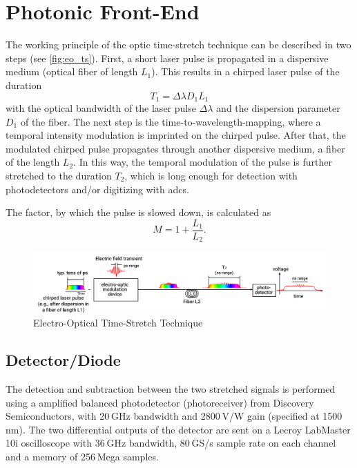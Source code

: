 \section{Photonic Front-End}
The working principle of the optic time-stretch technique can be described in two steps (see \autoref{fig:eo_ts}).
First, a short laser pulse is propagated in a dispersive medium (optical fiber of length $L_1$). %
This results in a chirped laser pulse of the duration
\begin{equation}
	T_1 = \Delta \lambda D_1 L_1
\end{equation}
with the optical bandwidth of the laser pulse $\Delta \lambda$  and the dispersion parameter $D_1$ of the fiber.
The next step is the time-to-wavelength-mapping, where a temporal intensity modulation is imprinted on the chirped pulse.
After that, the modulated chirped pulse propagates through another dispersive medium, a fiber of the length $L_2$.
In this way, the temporal modulation of the pulse is further stretched to the duration $T_2$, which is long enough for detection with photodetectors and/or digitizing with \Glspl{adc}. \cite{roussel2014}

The factor, by which the pulse is slowed down, is calculated as
\begin{equation}
	M = 1 + \frac{L_1}{L_2}.
\end{equation}

\begin{figure}[tbh]
	\centering
	\includegraphics[width = \textwidth]{chap/02-theory/img/time_stretch.png}
	\caption{Electro-Optical Time-Stretch Technique \cite{szwaj}}
	\label{fig:eo_ts}
\end{figure}


\subsection{Detector/Diode}

The detection and subtraction between the two stretched signals is performed using a amplified balanced photodetector (photoreceiver) from Discovery Semiconductors, with 20 GHz bandwidth and 2800 V/W gain (specified at 1500 nm). The two differential outputs of the detector are sent on a Lecroy LabMaster 10i oscilloscope with 36 GHz bandwidth, 80 GS/s sample rate on each channel and a memory of 256 Mega samples.

